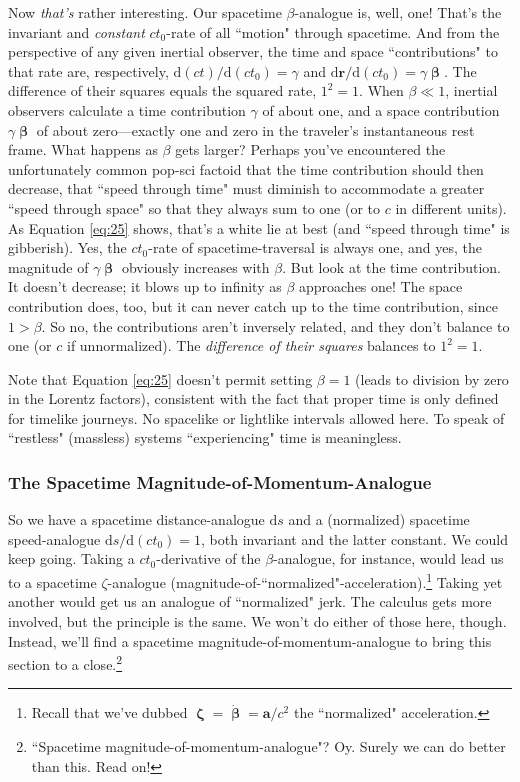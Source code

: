 \documentclass[12pt]{article}
\renewcommand{\vv}[1]{\mathbf{#1}}
\newcommand{\dd}[1]{\mathrm{d}#1}
\newcommand{\vvbeta}{\bm{\upbeta}}
\newcommand{\vvzeta}{\bm{\upzeta}}
\begin{document}
Now \emph{that's} rather interesting. Our spacetime $\beta$-analogue is, well, one! That's the invariant and \emph{constant} $c t_0$-rate of all ``motion" through spacetime. And from the perspective of any given inertial observer, the time and space ``contributions" to that rate are, respectively, $\dd (ct) / \dd (c t_0) =\gamma$ and $\dd \vv r / \dd (c t_0) = \gamma \vvbeta$. The difference of their squares equals the squared rate, $1^2 = 1$. When $\beta \ll 1$, inertial observers calculate a time contribution $\gamma$ of about one, and a space contribution $\gamma \vvbeta$ of about zero---exactly one and zero in the traveler's instantaneous rest frame. What happens as $\beta$ gets larger? Perhaps you've encountered the unfortunately common pop-sci factoid that the time contribution should then decrease, that ``speed through time" must diminish to accommodate a greater ``speed through space" so that they always sum to one (or to $c$ in different units). As Equation \ref{eq:25} shows, that's a white lie at best (and ``speed through time" is gibberish). Yes, the $ct_0$-rate of spacetime-traversal is always one, and yes, the magnitude of $\gamma \vvbeta$ obviously increases with $\beta$. But look at the time contribution. It doesn't decrease; it blows up to infinity as $\beta$ approaches one! The space contribution does, too, but it can never catch up to the time contribution, since $1>\beta$. So no, the contributions aren't inversely related, and they don't balance to one (or $c$ if unnormalized). The \emph{difference of their squares} balances to $1^2=1$.

Note that Equation \ref{eq:25} doesn't permit setting $\beta=1$ (leads to division by zero in the Lorentz factors), consistent with the fact that proper time is only defined for timelike journeys. No spacelike or lightlike intervals allowed here. To speak of ``restless" (massless) systems ``experiencing" time is meaningless.

\subsubsection{The Spacetime Magnitude-of-Momentum-Analogue}\label{sssec:pc}

So we have a spacetime distance-analogue $\dd s$ and a (normalized) spacetime speed-analogue $\dd s/\dd (c t_0)=1$, both invariant and the latter constant. We could keep going. Taking a $c t_0$-derivative of the $\beta$-analogue, for instance, would lead us to a spacetime $\zeta$-analogue (magnitude-of-``normalized"-acceleration).\footnote{Recall that we've dubbed $\vvzeta = \dot{\vvbeta} = \vv a / c^2$ the ``normalized" acceleration.} Taking yet another would get us an analogue of ``normalized" jerk. The calculus gets more involved, but the principle is the same. We won't do either of those here, though. Instead, we'll find a spacetime magnitude-of-momentum-analogue to bring this section to a close.\footnote{``Spacetime magnitude-of-momentum-analogue"? Oy. Surely we can do better than this. Read on!}
\end{document}
